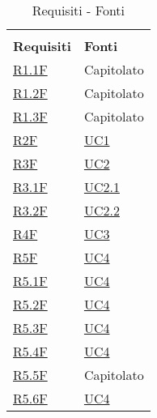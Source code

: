 
\begin{center}
    \centering
    \renewcommand{\arraystretch}{1.8}
    \label{tab:RequisitiFonti}
    \begin{longtable}[!h]{p{50px} p{50px}}
        \rowcolor{white}\caption{Requisiti - Fonti}                                  \\
        \rowcolor{logo!70} \textbf{Requisiti}        & \textbf{Fonti}                \\

        \hyperref[tab:RequisitiFunzionali]{R1.1F}    & Capitolato                    \\
        \hyperref[tab:RequisitiFunzionali]{R1.2F}    & Capitolato                    \\
        \hyperref[tab:RequisitiFunzionali]{R1.3F}    & Capitolato                    \\
        \hyperref[tab:RequisitiFunzionali]{R2F}      & \hyperref[sec:UC1]{UC1}       \\
        \hyperref[tab:RequisitiFunzionali]{R3F}      & \hyperref[sec:UC2]{UC2}       \\
        \hyperref[tab:RequisitiFunzionali]{R3.1F}    & \hyperref[sec:UC2.1]{UC2.1}   \\
        \hyperref[tab:RequisitiFunzionali]{R3.2F}    & \hyperref[sec:UC2.2]{UC2.2}   \\
        \hyperref[tab:RequisitiFunzionali]{R4F}      & \hyperref[sec:UC3]{UC3}       \\
        \hyperref[tab:RequisitiFunzionali]{R5F}      & \hyperref[sec:UC4]{UC4}       \\
        \hyperref[tab:RequisitiFunzionali]{R5.1F}    & \hyperref[sec:UC4]{UC4}       \\
        \hyperref[tab:RequisitiFunzionali]{R5.2F}    & \hyperref[sec:UC4]{UC4}       \\
        \hyperref[tab:RequisitiFunzionali]{R5.3F}    & \hyperref[sec:UC4]{UC4}       \\
        \hyperref[tab:RequisitiFunzionali]{R5.4F}    & \hyperref[sec:UC4]{UC4}       \\
        \hyperref[tab:RequisitiFunzionali]{R5.5F}    & Capitolato                    \\
        \hyperref[tab:RequisitiFunzionali]{R5.6F}    & \hyperref[sec:UC4]{UC4}       \\

\end{longtable}
\end{center}
